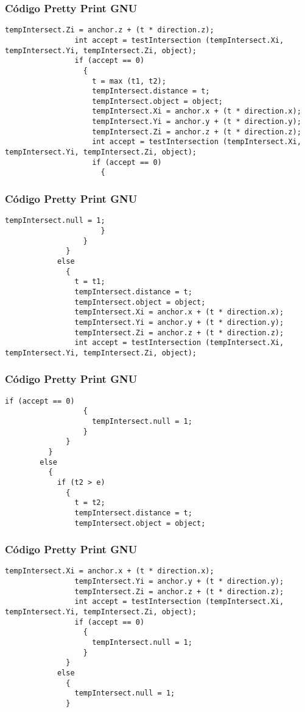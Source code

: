 \documentclass{beamer}
\begin{document}
\begin{frame}[fragile]
\frametitle{C\'odigo Pretty Print GNU}
\begin{lstlisting}[style=CStyle]
                tempIntersect.Zi = anchor.z + (t * direction.z);
                int accept = testIntersection (tempIntersect.Xi, tempIntersect.Yi, tempIntersect.Zi, object);
                if (accept == 0)
                  {
                    t = max (t1, t2);
                    tempIntersect.distance = t;
                    tempIntersect.object = object;
                    tempIntersect.Xi = anchor.x + (t * direction.x);
                    tempIntersect.Yi = anchor.y + (t * direction.y);
                    tempIntersect.Zi = anchor.z + (t * direction.z);
                    int accept = testIntersection (tempIntersect.Xi, tempIntersect.Yi, tempIntersect.Zi, object);
                    if (accept == 0)
                      {
                        \end{lstlisting}
\end{frame}
\begin{frame}[fragile]
\frametitle{C\'odigo Pretty Print GNU}
\begin{lstlisting}[style=CStyle]
                        tempIntersect.null = 1;
                      }
                  }
              }
            else
              {
                t = t1;
                tempIntersect.distance = t;
                tempIntersect.object = object;
                tempIntersect.Xi = anchor.x + (t * direction.x);
                tempIntersect.Yi = anchor.y + (t * direction.y);
                tempIntersect.Zi = anchor.z + (t * direction.z);
                int accept = testIntersection (tempIntersect.Xi, tempIntersect.Yi, tempIntersect.Zi, object);
\end{lstlisting}
\end{frame}
\begin{frame}[fragile]
\frametitle{C\'odigo Pretty Print GNU}
\begin{lstlisting}[style=CStyle]
                if (accept == 0)
                  {
                    tempIntersect.null = 1;
                  }
              }
          }
        else
          {
            if (t2 > e)
              {
                t = t2;
                tempIntersect.distance = t;
                tempIntersect.object = object;
\end{lstlisting}
\end{frame}
\begin{frame}[fragile]
\frametitle{C\'odigo Pretty Print GNU}
\begin{lstlisting}[style=CStyle]
                tempIntersect.Xi = anchor.x + (t * direction.x);
                tempIntersect.Yi = anchor.y + (t * direction.y);
                tempIntersect.Zi = anchor.z + (t * direction.z);
                int accept = testIntersection (tempIntersect.Xi, tempIntersect.Yi, tempIntersect.Zi, object);
                if (accept == 0)
                  {
                    tempIntersect.null = 1;
                  }
              }
            else
              {
                tempIntersect.null = 1;
              }
\end{lstlisting}
\end{frame}
\end{document}
